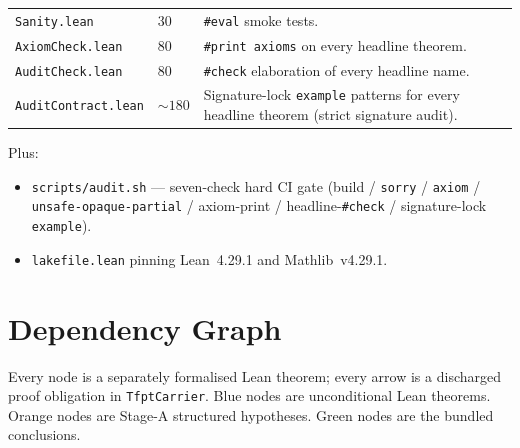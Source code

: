\begin{center}
\begin{tabularx}{0.98\textwidth}{@{}p{}p{}Y@{}}
\texttt{Sanity.lean}              & $30$      & \texttt{\#eval} smoke tests. \\
\texttt{AxiomCheck.lean}          & $80$      & \texttt{\#print axioms} on every headline theorem. \\
\texttt{AuditCheck.lean}          & $80$      & \texttt{\#check} elaboration of every headline name. \\
\texttt{AuditContract.lean}       & $\sim180$ & Signature-lock \texttt{example} patterns for every headline theorem (strict signature audit). \\
\bottomrule
\end{tabularx}
\end{center}

Plus:
\begin{itemize}[leftmargin=1.5em, itemsep=1pt]
\item \texttt{scripts/audit.sh} --- seven-check hard CI gate
      (build / \texttt{sorry} / \texttt{axiom} /
      \texttt{unsafe-opaque-partial} / axiom-print /
      headline-\texttt{\#check} / signature-lock \texttt{example}).
\item \texttt{lakefile.lean} pinning Lean~4.29.1 and Mathlib~v4.29.1.
\end{itemize}

\section{Dependency Graph}
\label{sec:graph}

Every node is a separately formalised Lean theorem; every arrow
is a discharged proof obligation in \texttt{TfptCarrier}. Blue
nodes are unconditional Lean theorems. Orange nodes are Stage-A
structured hypotheses. Green nodes are the bundled conclusions.

